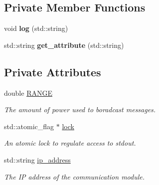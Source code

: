 \subsection*{Private Member Functions}
\begin{DoxyCompactItemize}
\item 
void {\bfseries log} (std\+::string)\hypertarget{class_basic__addressed_a5670a1cc648618caddc345935856e5c0}{}\label{class_basic__addressed_a5670a1cc648618caddc345935856e5c0}

\item 
std\+::string {\bfseries get\+\_\+attribute} (std\+::string)\hypertarget{class_basic__addressed_aa75d84e2076b7ae4de8ddde1074da8ed}{}\label{class_basic__addressed_aa75d84e2076b7ae4de8ddde1074da8ed}

\end{DoxyCompactItemize}
\subsection*{Private Attributes}
\begin{DoxyCompactItemize}
\item 
double \hyperlink{class_basic__addressed_ab034a50f20042c6902c46aac50ab6d59}{R\+A\+N\+GE}\hypertarget{class_basic__addressed_ab034a50f20042c6902c46aac50ab6d59}{}\label{class_basic__addressed_ab034a50f20042c6902c46aac50ab6d59}

\begin{DoxyCompactList}\small\item\em The amount of power used to boradcast messages. \end{DoxyCompactList}\item 
std\+::atomic\+\_\+flag $\ast$ \hyperlink{class_basic__addressed_ae89d21666c064b0bae2baecb6a161598}{lock}\hypertarget{class_basic__addressed_ae89d21666c064b0bae2baecb6a161598}{}\label{class_basic__addressed_ae89d21666c064b0bae2baecb6a161598}

\begin{DoxyCompactList}\small\item\em An atomic lock to regulate access to stdout. \end{DoxyCompactList}\item 
std\+::string \hyperlink{class_basic__addressed_ab379c6caf755034091cb471c0210cdd3}{ip\+\_\+address}\hypertarget{class_basic__addressed_ab379c6caf755034091cb471c0210cdd3}{}\label{class_basic__addressed_ab379c6caf755034091cb471c0210cdd3}

\begin{DoxyCompactList}\small\item\em The IP address of the communication module. \end{DoxyCompactList}\end{DoxyCompactItemize}
